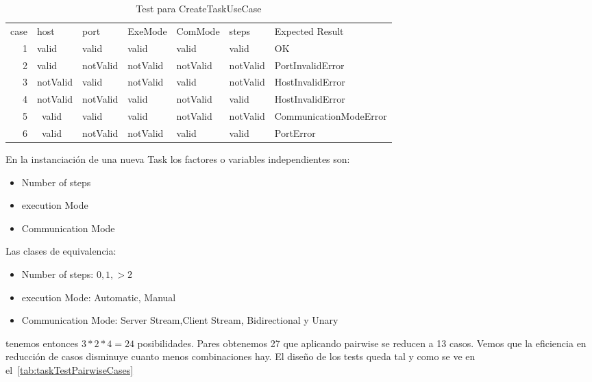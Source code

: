 \begin{table}[H]
    \small
    \begin{tabular}{rllllll}
        case & host     & port     & ExeMode  & ComMode  & steps    & Expected Result        \\
        1    & valid    & valid    & valid    & valid    & valid    & OK                     \\
        2    & valid    & notValid & notValid & notValid & notValid & PortInvalidError       \\
        3    & notValid & valid    & notValid & valid    & notValid & HostInvalidError       \\
        4    & notValid & notValid & valid    & notValid & valid    & HostInvalidError       \\
        5    & ~valid   & valid    & valid    & notValid & notValid & CommunicationModeError \\
        6    & ~valid   & notValid & notValid & valid    & valid    & PortError
    \end{tabular}
    \caption{Test para CreateTaskUseCase}\label{tab:createTaskPairWiseTest}
\end{table}

En la instanciación de una nueva Task los factores o variables independientes son:

\begin{itemize}
    \item Number of steps
    \item execution Mode
    \item Communication Mode
\end{itemize}

Las clases de equivalencia:

\begin{itemize}
    \item Number of steps: $0, 1, >2$
    \item execution Mode: Automatic, Manual
    \item Communication Mode: Server Stream,Client Stream, Bidirectional y Unary
\end{itemize}

tenemos entonces  $3*2*4 = 24$ posibilidades. Pares obtenemos 27 que aplicando pairwise se reducen a 13 casos. Vemos que la eficiencia en reducción de casos disminuye cuanto menos combinaciones hay. El diseño de los tests queda tal y como se ve en el~\cref{tab:taskTestPairwiseCases}

